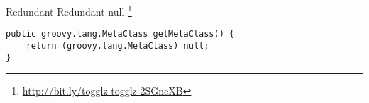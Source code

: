 \begin{pattern}{Redundant}
Redundant null
\footnote{\url{http://bit.ly/togglz-togglz-2SGncXB}}

\begin{verbatim}
public groovy.lang.MetaClass getMetaClass() {
    return (groovy.lang.MetaClass) null;
}
\end{verbatim}

\detection{}

\discussion{}

\related{}
    
\end{pattern}